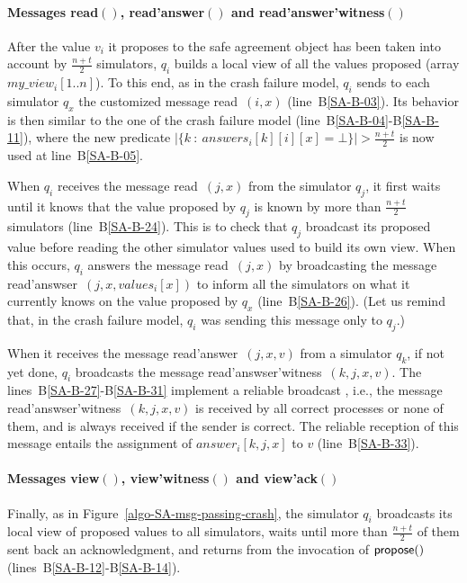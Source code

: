 \documentclass[11pt,letterpaper]{article}
\begin{document}
\paragraph{Messages {\sc read}$()$, {\sc read'answer}$()$ and
          {\sc read'answer'witness}$()$}
 After the value $v_i$ it proposes to the safe agreement object has been
taken  into  account by $\frac{n+t}{2 }$ simulators,  $q_i$  builds a
local view  of all the values proposed (array $\mathit{my\_view_i}[1..n]$). To this end, as in  the crash
failure model,  $q_i$  sends to each simulator $q_x$ the customized message
{\sc read}~$(i,x)$ (line~B\ref{SA-B-03}).
Its behavior is then similar to the one of the crash failure model
(line~B\ref{SA-B-04}-B\ref{SA-B-11}), where the new predicate
$|\{k~:~answers_i[k][i][x]=\bot\}|>\frac{n+t}{2}$ is now used at
line~B\ref{SA-B-05}.


When  $q_i$ receives  the message   {\sc read}~$(j,x)$  from  the simulator
$q_j$, it first waits until it knows that the  value proposed by $q_j$
is known by more than $\frac{n+t}{2}$ simulators (line~B\ref{SA-B-24}).
This is to check that $q_j$ broadcast its proposed value before
reading the other simulator values used  to build its own view.
When  this   occurs,  $q_i$ answers the  message {\sc  read}~$(j,x)$
by broadcasting the message  {\sc read'answser}~$(j,x,values_i[x])$
 to inform all the simulators on what it currently knows on the value
proposed by $q_x$ (line~B\ref{SA-B-26}). (Let us remind that, in  the
crash failure model, $q_i$ was sending this message only to $q_j$.)



When it receives the message {\sc read'answer}~$(j,x,v)$ from a simulator
$q_k$,  if not yet done,   $q_i$ broadcasts the message
{\sc read'answser'witness}~$(k,j,x,v)$.
The lines~B\ref{SA-B-27}-B\ref{SA-B-31} implement a reliable broadcast
\cite{B87}, i.e., the message {\sc read'answser'witness}~$(k,j,x,v)$
is   received by all correct  processes  or none of  them,  and is  always
received if the sender is correct. The reliable  reception of  this
message entails the assignment of $answer_i[k,j,x]$ to $v$
(line~B\ref{SA-B-33}).


\paragraph{Messages {\sc view}$()$, {\sc view'witness}$()$
           and {\sc view'ack}$()$}
Finally, as in Figure~\ref{algo-SA-msg-passing-crash},
the simulator $q_i$ broadcasts its local view of proposed values to
all  simulators, waits until more than  $\frac{n+t}{2}$ of them sent back an
acknowledgment, and returns  from  the  invocation  of
${\sf propose}()$ (lines~B\ref{SA-B-12}-B\ref{SA-B-14}).
\end{document}

